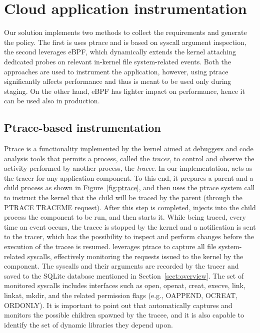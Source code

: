 \section{Cloud application instrumentation}\label{sect:cloud-instrum}

Our solution implements two methods to collect the requirements and
generate the policy. The first is uses ptrace and is based on syscall
argument inspection, the second leverages eBPF, which dynamically
extends the kernel attaching dedicated probes on relevant
\mbox{in-kernel} file system-related events. Both the approaches are
used to instrument the application, however, using ptrace
significantly affects performance and thus is meant to be used only
during staging. On the other hand, eBPF has lighter impact on
performance, hence it can be used also in production.

\subsection{Ptrace-based instrumentation}\label{sect:deep-instr}

Ptrace is a functionality implemented by the kernel aimed at debuggers
and code analysis tools that permits a process, called the {\em
  tracer}, to control and observe the activity performed by another
process, the {\em tracee}. In our implementation, \dmng acts as the
tracer for any application component. To this end, it prepares a
parent and a child process as shown in Figure~\ref{fig:ptrace}, and
then uses the ptrace system call to instruct the kernel that the child
will be traced by the parent (through the PTRACE\textunderscore
  TRACEME request). After this step is completed, \dmng injects into
the child process the component to be run, and then starts it.  While
being traced, every time an event occurs, the tracee is stopped by the
kernel and a notification is sent to the tracer, which has the
possibility to inspect and perform changes before the execution of the
tracee is resumed.  \dmng leverages ptrace to capture all file
system-related syscalls, effectively monitoring the requests issued to
the kernel by the component. The syscalls and their arguments are
recorded by the tracer and saved to the SQLite database mentioned in
Section~\ref{sect:overview}. The set of monitored syscalls includes
interfaces such as open, openat, creat, execve, link, linkat, mkdir,
and the related permission flags (e.g., O\textunderscore APPEND,
O\textunderscore CREAT, O\textunderscore RDONLY). It is
important to point out that \dmng automatically captures and monitors
the possible children spawned by the tracee, and it is also capable to
identify the set of dynamic libraries they depend upon.


